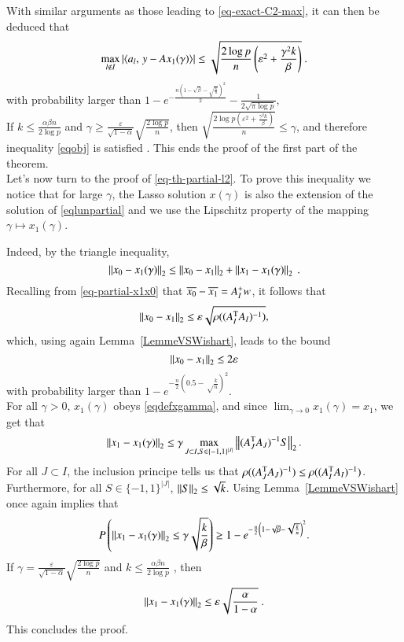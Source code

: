 With similar arguments as those leading to \eqref{eq-exact-C2-max}, it can then be deduced that 
\begin{equation}
\max_{l\notin I}|\langle a_l,\,y-Ax_1(\gamma)\rangle|\leq
\sqrt{\frac{2\log p}{n}\left(\varepsilon^2+\frac{\gamma^2k}{\beta}\right)} ~.
\end{equation}
with probability larger than $1-e^{-\frac{n\left(1-\sqrt{\beta}-\sqrt{\frac{k}{n}}\right)^2}{2}}-\frac{1}{2\sqrt{\pi\log p}}$,
\\
If $k\leq \frac{\alpha \beta n}{2\log p}$ and $\gamma\geq\frac{\varepsilon}{\sqrt{1-\alpha}}\sqrt{\frac{2\log p}{n}}$, then $\sqrt{\frac{2\log p\left(\varepsilon^2+\frac{\gamma^2k}{\beta}\right)}{n}}\leq \gamma$, and therefore inequality \eqref{eqobj} is satisfied \wop. This ends the proof of the first part of the theorem.\\


Let's now turn to the proof of \eqref{eq-th-partial-l2}. 
To prove this inequality we notice that for large $\gamma$, the Lasso solution $x(\gamma)$ is also the extension of the solution of \eqref{eqlunpartial} \wop and we use the Lipschitz property of the mapping $\gamma \mapsto x_1(\gamma)$.

Indeed, by the triangle inequality, 
\begin{equation}
\left\Vert{x_0-x_1(\gamma)}\right\Vert_{2}\leq \left\Vert{x_0-x_1}\right\Vert_{2}+\left\Vert{x_1-x_1(\gamma)}\right\Vert_{2} ~.
\end{equation}
Recalling from \eqref{eq-partial-x1x0} that $\overline{x_0}-\overline{x_1}=A_I^+ w$, it follows that  
\[
\left\Vert{x_0-x_1}\right\Vert_{2}\leq \varepsilon \sqrt{\rho((A_I^\mathrm{T} A_I)^{-1})},
\]
which, using again Lemma~\ref{LemmeVSWishart}, leads to the bound
\[
\left\Vert{x_0-x_1}\right\Vert_{2}\leq 2\varepsilon
\] 
with probability larger than $1-e^{-\frac{n}{2}\left(0.5-\sqrt\frac{k}{n}\right)^2}$. \\

For all $\gamma>0$, $x_1(\gamma)$ obeys \eqref{eqdefxgamma}, and since $\lim_{\gamma \to 0}x_1(\gamma)=x_1$, we get that 
\begin{equation}
\left\Vert{x_1-x_1(\gamma)}\right\Vert_{2}\leq \gamma\max_{J \subset I,S\in\{-1,1\}^{|J|}} \left\Vert{(A_J^\mathrm{T}A_J)^{-1}S}\right\Vert_{2}.
\end{equation} 
For all $J\subset I$, the inclusion principe tells us that $\rho((A_J^\mathrm{T}A_J)^{-1})\leq \rho((A_I^\mathrm{T} A_I)^{-1})$. Furthermore, for all $S\in \{-1,1\}^{|J|}$, $\left\Vert{S}\right\Vert_{2}\leq \sqrt{k}$. Using Lemma~\ref{LemmeVSWishart} once again implies that
\begin{equation*}
P\left(\left\Vert{x_1-x_1(\gamma)}\right\Vert_{2}\leq \gamma\sqrt{\frac{k}{\beta}}\right)\geq 1-e^{-\frac{n}{2}\left(1-\sqrt{\beta}-\sqrt{\frac{k}{n}}\right)^2}.
\end{equation*}
If $\gamma=\frac{\varepsilon}{\sqrt{1-\alpha}}\sqrt{\frac{2\log p}{n}}$ and $k\leq \frac{\alpha \beta n}{2\log p}$ , then \wop
\begin{equation*}
\left\Vert{x_1-x_1(\gamma)}\right\Vert_{2}\leq \varepsilon\sqrt{\frac{\alpha}{1-\alpha}}~.
\end{equation*}
This concludes the proof.

